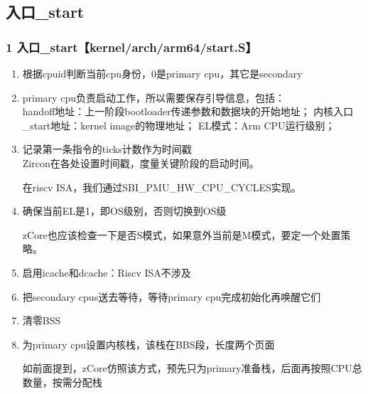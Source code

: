 \documentclass[
8pt, %
]{beamer}
\begin{document}
	\subsection{入口\_start}

	\begin{frame}
		\frametitle{1 入口\_start【kernel/arch/arm64/start.S】}
		\begin{enumerate}
			\item 根据cpuid判断当前cpu身份，0是primary cpu，其它是secondary
			\item primary cpu负责启动工作，所以需要保存引导信息，包括：\\
			handoff地址：上一阶段bootloader传递参数和数据块的开始地址；
			内核入口\_start地址：kernel image的物理地址；
			EL模式：Arm CPU运行级别；
			\item 记录第一条指令的ticks计数作为时间戳\\
			Zircon在各处设置时间戳，度量关键阶段的启动时间。
			\begin{block}{}
				在riscv ISA，我们通过SBI\_PMU\_HW\_CPU\_CYCLES实现。
			\end{block}
			\item 确保当前EL是1，即OS级别，否则切换到OS级
			\begin{block}{}
				zCore也应该检查一下是否S模式，如果意外当前是M模式，要定一个处置策略。
			\end{block}
			\item 启用icache和dcache：Riscv ISA不涉及
			\item 把secondary cpus送去等待，等待primary cpu完成初始化再唤醒它们
			\item 清零BSS
			\item 为primary cpu设置内核栈，该栈在BBS段，长度两个页面
			\begin{block}{}
				如前面提到，zCore仿照该方式，预先只为primary准备栈，后面再按照CPU总数量，按需分配栈
			\end{block}
		\end{enumerate}
	\end{frame}
\end{document}
